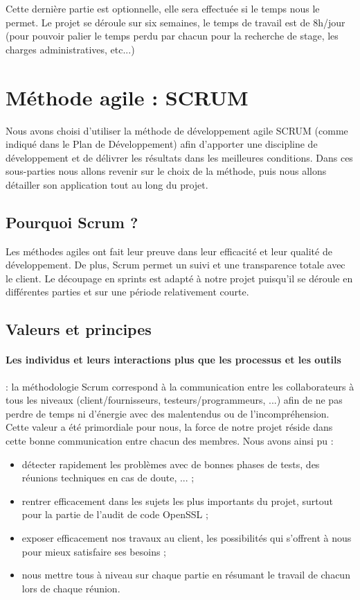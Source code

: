 Cette dernière partie est optionnelle, elle sera effectuée si le temps nous le permet. Le projet se déroule sur six semaines, le temps de travail est de 8h/jour (pour pouvoir palier le temps perdu par chacun pour la recherche de stage, les charges administratives, etc...)

\section{Méthode agile : SCRUM}

Nous avons choisi d'utiliser la méthode de développement agile SCRUM (comme indiqué dans le Plan de Développement) afin d'apporter une discipline de développement et de délivrer les résultats dans les meilleures conditions. Dans ces sous-parties nous allons revenir sur le choix de la méthode, puis nous allons détailler son application tout au long du projet.

\subsection{Pourquoi Scrum ?}

Les méthodes agiles ont fait leur preuve dans leur efficacité et leur qualité de développement. De plus, Scrum permet un suivi et une transparence totale avec le client. Le découpage en sprints est adapté à notre projet puisqu'il se déroule en différentes parties et sur une période relativement courte.

\subsection{Valeurs et principes}

\paragraph{Les individus et leurs interactions plus que les processus et les outils} : la méthodologie Scrum correspond à la communication entre les collaborateurs à tous les niveaux (client/fournisseurs, testeurs/programmeurs, ...) afin de ne pas perdre de temps ni d’énergie avec des malentendus ou de l’incompréhension.\\

Cette valeur a été primordiale pour nous, la force de notre projet réside dans cette bonne communication entre chacun des membres. Nous avons ainsi pu :
\begin{itemize}
\item détecter rapidement les problèmes avec de bonnes phases de tests, des réunions techniques en cas de doute, ... ;
\item rentrer efficacement dans les sujets les plus importants du projet, surtout pour la partie de l'audit de code OpenSSL ;
\item exposer efficacement nos travaux au client, les possibilités qui s'offrent à nous pour mieux satisfaire ses besoins ;
\item nous mettre tous à niveau sur chaque partie en résumant le travail de chacun lors de chaque réunion.\\
\end{itemize}


